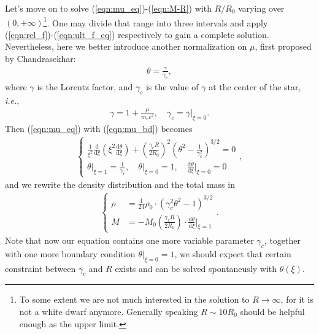 \documentclass[a4paper,11pt]{article}
\newcommand{\mathdd}{\mathrm{d}}
\numberwithin{equation}{section}
\numberwithin{table}{section}
\numberwithin{figure}{section}
\begin{document}
			Let's move on to solve (\ref{eqn:mu_eq})-(\ref{eqn:M-R}) with $R/R_0$ varying over $(0,+\infty)$\footnote{To some extent we are not much interested in the solution to $R\rightarrow\infty$, for it is not a white dwarf anymore. Generally speaking $R\sim10R_0$ should be helpful enough as the upper limit.}. One may divide that range into three intervals and apply (\ref{eqn:rel_f})-(\ref{eqn:ult_f_eq}) respectively to gain a complete solution. Nevertheless, here we better introduce another normalization on $\mu$, first proposed by Chandrasekhar\cite{chandrasekhar1935highly}:
			\begin{align}
				\theta=\frac{\gamma}{\gamma_c},
				\label{eqn:chan_norm}
			\end{align}
			where $\gamma$ is the Lorentz factor, and $\gamma_c$ is the value of $\gamma$ at the center of the star, \textit{i.e.},
			\begin{align}
				\gamma=1+\frac{\mu}{m_ec^2},\quad 
					\gamma_c=\gamma\Big|_{\xi=0}.
			\end{align}
			Then (\ref{eqn:mu_eq}) with (\ref{eqn:mu_bd}) becomes
			\begin{align}
				\left\{\begin{gathered}
					\frac{1}{\xi^2}\frac{\mathdd}{\mathdd\xi}
						\left(\xi^2\frac{\mathdd\theta}{\mathdd\xi}\right)
						+\left(\frac{\gamma_cR}{2R_0}\right)^2
						\left(\theta^2-\frac{1}{\gamma_c^2}\right)^{3/2}=0 \\
					\theta\bigg|_{\xi=1}=\frac{1}{\gamma_c},\quad
						\theta\bigg|_{\xi=0}=1,\quad
						\frac{\mathdd\theta}{\mathdd\xi}\bigg|_{\xi=0}=0
				\end{gathered}\right. ,
				\label{eqn:chan_theta}
			\end{align}
			and we rewrite the density distribution and the total mass in
			\begin{align}
				\left\{\begin{aligned}
					\rho&=\frac{1}{24}\rho_0\cdot(\gamma_c^2\theta^2-1)^{3/2} \\
					M&=-M_0\left(\frac{\gamma_cR}{2R_0}\right)\cdot
					\frac{\mathdd\theta}{\mathdd\xi}\bigg|_{\xi=1}
				\end{aligned}\right. .
			\end{align}
			Note that now our equation contains one more variable parameter $\gamma_c$, together with one more boundary condition $\theta|_{\xi=0}=1$, we should expect that certain constraint between $\gamma_c$ and $R$ exists and can be solved
			spontaneusly with $\theta(\xi)$. 
			
\end{document}
